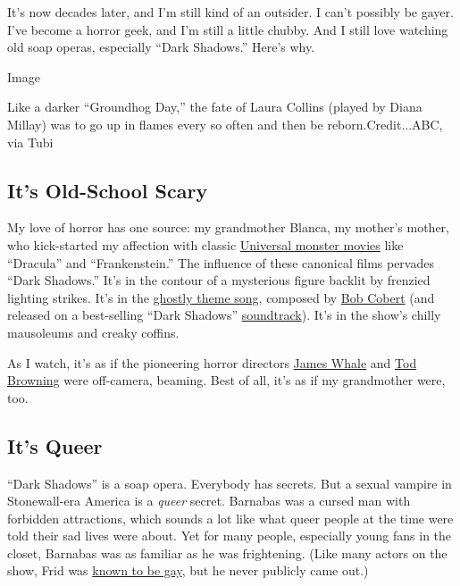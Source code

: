 It's now decades later, and I'm still kind of an outsider. I can't
possibly be gayer. I've become a horror geek, and I'm still a little
chubby. And I still love watching old soap operas, especially ``Dark
Shadows.'' Here's why.

Image

Like a darker ``Groundhog Day,'' the fate of Laura Collins (played by
Diana Millay) was to go up in flames every so often and then be
reborn.Credit...ABC, via Tubi

\hypertarget{its-old-school-scary}{%
\subsection{It's Old-School Scary}\label{its-old-school-scary}}

My love of horror has one source: my grandmother Blanca, my mother's
mother, who kick-started my affection with classic
\href{https://universalmonsters.fandom.com/wiki/Universal_Monsters}{Universal
monster movies} like ``Dracula'' and ``Frankenstein.'' The influence of
these canonical films pervades ``Dark Shadows.'' It's in the contour of
a mysterious figure backlit by frenzied lighting strikes. It's in the
\href{https://www.youtube.com/watch?v=bfWIQfqik3c}{ghostly theme song},
composed by
\href{https://variety.com/2020/music/obituaries-people-news/bob-cobert-dead-dies-dark-shadows-winds-of-war-1203512992/}{Bob
Cobert} (and released on a best-selling ``Dark Shadows''
\href{https://metv.com/stories/rip-bob-cobert-who-composed-the-eerie-music-of-dark-shadows}{soundtrack}).
It's in the show's chilly mausoleums and creaky coffins.

As I watch, it's as if the pioneering horror directors
\href{https://www.nytimes3xbfgragh.onion/1957/05/30/archives/film-producer-dead-james-whale-falls-into-pool-directed.html}{James
Whale} and
\href{https://www.nytimes3xbfgragh.onion/1962/10/10/archives/tod-browning-80-exfilm-director-maker-of-chaney-and-lugosi-films.html}{Tod
Browning} were off-camera, beaming. Best of all, it's as if my
grandmother were, too.

\hypertarget{its-queer}{%
\subsection{It's Queer}\label{its-queer}}

``Dark Shadows'' is a soap opera. Everybody has secrets. But a sexual
vampire in Stonewall-era America is a \emph{queer} secret. Barnabas was
a cursed man with forbidden attractions, which sounds a lot like what
queer people at the time were told their sad lives were about. Yet for
many people, especially young fans in the closet, Barnabas was as
familiar as he was frightening. (Like many actors on the show, Frid was
\href{http://weareflagrant.com/eleven-dark-shadows-actors-probably-didnt-know-gay/}{known
to be gay}, but he never publicly came out.)

